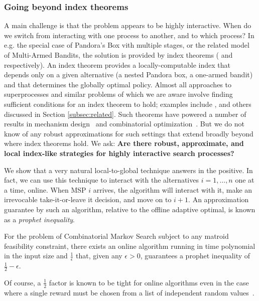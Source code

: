 \subsubsection{Going beyond index theorems}

A main challenge is that the problem appears to be highly interactive.
When do we switch from interacting with one process to another, and to which process?
In e.g. the special case of Pandora's Box vith multiple stages, or the related model of Multi-Armed Bandits, the solution is provided by index theorems (\citet{weitzman1979optimal} and \citet{gittins1979bandit} respectively).
An index theorem provides a locally-computable index that depends only on a given alternative (a nested Pandora box, a one-armed bandit) and that determines the globally optimal policy.
Almost all approaches to superprocesses and similar problems of which we are aware involve finding sufficient conditions for an index theorem to hold; examples include \citet{whittle1980multi,glazebrook1982sufficient,keller2003branching,gupta2019markovian}, and others discussed in Section \ref{subsec:related}.
Such theorems have powered a number of results in mechanism design~\citep{kleinberg2016descending,bowers2023high, immorlica2020information} and combinatorial optimization~\citep{singla2018price,gupta2019markovian}.
But we do not know of any robust approximations for such settings that extend broadly beyond where index theorems hold.
We ask: \textbf{Are there robust, approximate, and local index-like strategies for highly interactive search processes?}

We show that a very natural local-to-global technique answers in the positive.
In fact, we can use this technique to interact with the alternatives $i=1,\dots,n$ one at a time, online.
When MSP $i$ arrives, the algorithm will interact with it, make an irrevocable take-it-or-leave it decision, and move on to $i+1$.
An approximation guarantee by such an algorithm, relative to the offline adaptive optimal, is known as a \emph{prophet inequality}.
\begin{theorem*}
  For the problem of Combinatorial Markov Search subject to any matroid feasibility constraint, there exists an online algorithm running in time polynomial in the input size and $\frac{1}{\epsilon}$ that, given any $\epsilon > 0$, guarantees a prophet inequality of $\frac{1}{2} - \epsilon$.
\end{theorem*}
Of course, a $\frac{1}{2}$ factor is known to be tight for online algorithms even in the case where a single reward must be chosen from a list of independent random values~\citep{samuelcahn1984comparison}.


